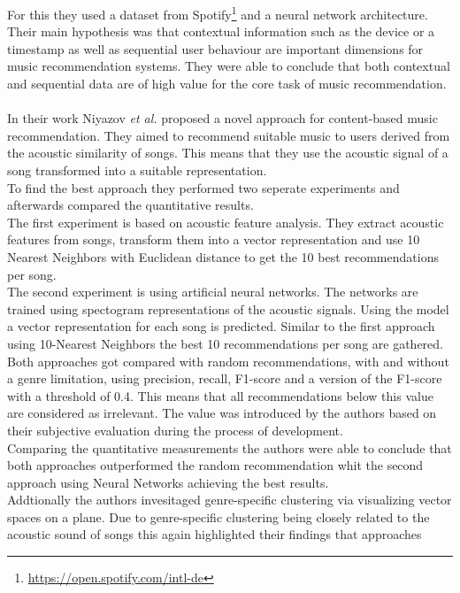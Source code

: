 \documentclass[runningheads,a4paper]{llncs}
\begin{document}
For this they used a dataset from Spotify\footnote{\url{https://open.spotify.com/intl-de}} and a neural network architecture. \\
Their main hypothesis was that contextual information such as the device or a timestamp as well as sequential user behaviour are 
 important dimensions for music recommendation systems.
They were able to conclude that both contextual and sequential data are of high value for the core task of music recommendation. 
\cite{hansen2020contextual}\\
\\
In their work Niyazov \textit{et al.} proposed a novel approach for content-based music recommendation. 
They aimed to recommend suitable music to users derived from the acoustic similarity of songs.
This means that they use the acoustic signal of a song transformed into a suitable representation. \\
To find the best approach they performed two seperate experiments and afterwards compared the quantitative results.\\
The first experiment is based on acoustic feature analysis. 
They extract acoustic features from songs, transform them into a vector representation and use 10 Nearest Neighbors with Euclidean distance 
to get the 10 best recommendations per song. \\
The second experiment is using artificial neural networks. 
The networks are trained using spectogram representations of the acoustic signals.
Using the model a vector representation for each song is predicted. 
Similar to the first approach using 10-Nearest Neighbors the best 10 recommendations per song are gathered. \\
Both approaches got compared with random recommendations, with and without a genre limitation, using precision, recall, F1-score and a version of the F1-score with a threshold of 0.4.
This means that all recommendations below this value are considered as irrelevant. The value was introduced by the authors based on their subjective evaluation during the process of development.\\
Comparing the quantitative measurements the authors were able to conclude that both approaches outperformed the random recommendation
whit the second approach using Neural Networks achieving the best results. \\
Addtionally the authors invesitaged genre-specific clustering via visualizing vector spaces on a plane. 
Due to genre-specific clustering being closely related to the acoustic sound of songs this again highlighted their findings that approaches 
\end{document}
